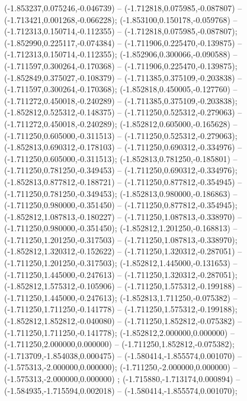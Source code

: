  (-1.853237,0.075246,-0.046739) -- (-1.712818,0.075985,-0.087807) -- (-1.713421,0.001268,-0.066228);
 (-1.853100,0.150178,-0.059768) -- (-1.712313,0.150714,-0.112355) -- (-1.712818,0.075985,-0.087807);
 (-1.852990,0.225117,-0.074384) -- (-1.711906,0.225470,-0.139875) -- (-1.712313,0.150714,-0.112355);
 (-1.852906,0.300066,-0.090588) -- (-1.711597,0.300264,-0.170368) -- (-1.711906,0.225470,-0.139875);
 (-1.852849,0.375027,-0.108379) -- (-1.711385,0.375109,-0.203838) -- (-1.711597,0.300264,-0.170368);
 (-1.852818,0.450005,-0.127760) -- (-1.711272,0.450018,-0.240289) -- (-1.711385,0.375109,-0.203838);
 (-1.852812,0.525312,-0.148375) -- (-1.711250,0.525312,-0.279063) -- (-1.711272,0.450018,-0.240289);
 (-1.852812,0.605000,-0.165628) -- (-1.711250,0.605000,-0.311513) -- (-1.711250,0.525312,-0.279063);
 (-1.852813,0.690312,-0.178103) -- (-1.711250,0.690312,-0.334976) -- (-1.711250,0.605000,-0.311513);
 (-1.852813,0.781250,-0.185801) -- (-1.711250,0.781250,-0.349453) -- (-1.711250,0.690312,-0.334976);
 (-1.852813,0.877812,-0.188721) -- (-1.711250,0.877812,-0.354945) -- (-1.711250,0.781250,-0.349453);
 (-1.852813,0.980000,-0.186863) -- (-1.711250,0.980000,-0.351450) -- (-1.711250,0.877812,-0.354945);
 (-1.852812,1.087813,-0.180227) -- (-1.711250,1.087813,-0.338970) -- (-1.711250,0.980000,-0.351450);
 (-1.852812,1.201250,-0.168813) -- (-1.711250,1.201250,-0.317503) -- (-1.711250,1.087813,-0.338970);
 (-1.852812,1.320312,-0.152622) -- (-1.711250,1.320312,-0.287051) -- (-1.711250,1.201250,-0.317503);
 (-1.852812,1.445000,-0.131653) -- (-1.711250,1.445000,-0.247613) -- (-1.711250,1.320312,-0.287051);
 (-1.852812,1.575312,-0.105906) -- (-1.711250,1.575312,-0.199188) -- (-1.711250,1.445000,-0.247613);
 (-1.852813,1.711250,-0.075382) -- (-1.711250,1.711250,-0.141778) -- (-1.711250,1.575312,-0.199188);
 (-1.852812,1.852812,-0.040080) -- (-1.711250,1.852812,-0.075382) -- (-1.711250,1.711250,-0.141778);
 (-1.852812,2.000000,0.000000) -- (-1.711250,2.000000,0.000000) -- (-1.711250,1.852812,-0.075382);
 (-1.713709,-1.854038,0.000475) -- (-1.580414,-1.855574,0.001070) -- (-1.575313,-2.000000,0.000000);
 (-1.711250,-2.000000,0.000000) -- (-1.575313,-2.000000,0.000000) ;
 (-1.715880,-1.713174,0.000894) -- (-1.584935,-1.715594,0.002018) -- (-1.580414,-1.855574,0.001070);
